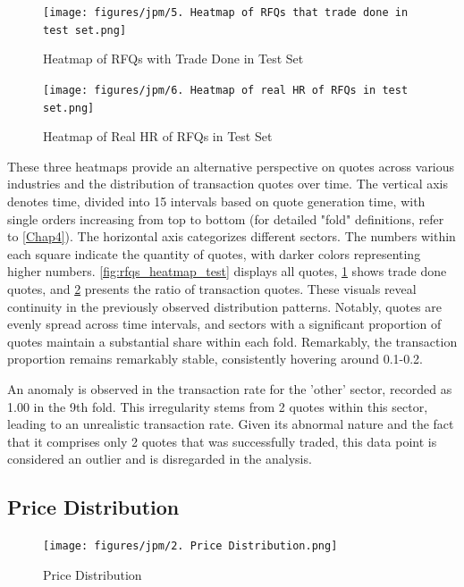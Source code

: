 \begin{figure}[H]
    \centering
    \texttt{[image: figures/jpm/5. Heatmap of RFQs that trade done in test set.png]}
    \caption{Heatmap of RFQs with Trade Done in Test Set}
    \label{fig:rfqs_heatmap_trade_done_test}
\end{figure}

\begin{figure}[H]
    \centering
    \texttt{[image: figures/jpm/6. Heatmap of real HR of RFQs in test set.png]}
    \caption{Heatmap of Real HR of RFQs in Test Set}
    \label{fig:rfqs_heatmap_real_hr_test}
\end{figure}

These three heatmaps provide an alternative perspective on quotes across various industries and the distribution of transaction quotes over time. The vertical axis denotes time, divided into 15 intervals based on quote generation time, with single orders increasing from top to bottom (for detailed "fold" definitions, refer to \ref{Chap4}). The horizontal axis categorizes different sectors. The numbers within each square indicate the quantity of quotes, with darker colors representing higher numbers. \ref{fig:rfqs_heatmap_test} displays all quotes, \ref{fig:rfqs_heatmap_trade_done_test} shows trade done quotes, and \ref{fig:rfqs_heatmap_real_hr_test} presents the ratio of transaction quotes. These visuals reveal continuity in the previously observed distribution patterns. Notably, quotes are evenly spread across time intervals, and sectors with a significant proportion of quotes maintain a substantial share within each fold. Remarkably, the transaction proportion remains remarkably stable, consistently hovering around 0.1-0.2. 

An anomaly is observed in the transaction rate for the 'other' sector, recorded as 1.00 in the 9th fold. This irregularity stems from 2 quotes within this sector, leading to an unrealistic transaction rate. Given its abnormal nature and the fact that it comprises only 2 quotes that was successfully traded, this data point is considered an outlier and is disregarded in the analysis.

\subsection{Price Distribution}
\begin{figure}[ht]
    \centering
    \texttt{[image: figures/jpm/2. Price Distribution.png]}
    \caption{Price Distribution}
    \label{fig:price_distribution}
\end{figure}

